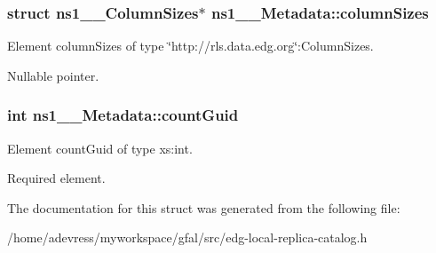 \subsubsection{\setlength{\rightskip}{0pt plus 5cm}struct \bf{ns1\_\-\_\-Column\-Sizes}$\ast$ \bf{ns1\_\-\_\-Metadata::column\-Sizes}}\label{structns1____Metadata_d337db8cc3d23fa8d7fe7d23de2bc6cb}


Element column\-Sizes of type \char`\"{}http://rls.data.edg.org\char`\"{}:Column\-Sizes. 

Nullable pointer. 
\subsubsection{\setlength{\rightskip}{0pt plus 5cm}int \bf{ns1\_\-\_\-Metadata::count\-Guid}}\label{structns1____Metadata_3b53e7f95c2570be18bfa980e081a102}


Element count\-Guid of type xs:int. 

Required element. 

The documentation for this struct was generated from the following file:\begin{CompactItemize}
\item 
/home/adevress/myworkspace/gfal/src/edg-local-replica-catalog.h\end{CompactItemize}
